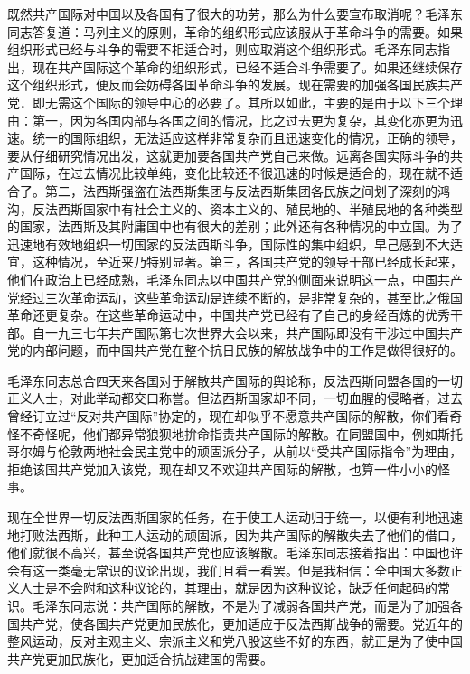 既然共产国际对中国以及各国有了很大的功劳，那么为什么要宣布取消呢？毛泽东同志答复道：马列主义的原则，革命的组织形式应该服从于革命斗争的需要。如果组织形式已经与斗争的需要不相适合时，则应取消这个组织形式。毛泽东同志指出，现在共产国际这个革命的组织形式，已经不适合斗争需要了。如果还继续保存这个组织形式，便反而会妨碍各国革命斗争的发展。现在需要的加强各国民族共产党．即无需这个国际的领导中心的必要了。其所以如此，主要的是由于以下三个理由：第一，因为各国内部与各国之间的情况，比之过去更为复杂，其变化亦更为迅速。统一的国际组织，无法适应这样非常复杂而且迅速变化的情况，正确的领导，要从仔细研究情况出发，这就更加要各国共产党自己来做。远离各国实际斗争的共产国际，在过去情况比较单纯，变化比较还不很迅速的时候是适合的，现在就不适合了。第二，法西斯强盗在法西斯集团与反法西斯集团各民族之间划了深刻的鸿沟，反法西斯国家中有社会主义的、资本主义的、殖民地的、半殖民地的各种类型的国家，法西斯及其附庸国中也有很大的差别；此外还有各种情况的中立国。为了迅速地有效地组织一切国家的反法西斯斗争，国际性的集中组织，早己感到不大适宜，这种情况，至近来乃特别显著。第三，各国共产党的领导干部已经成长起来，他们在政治上已经成熟，毛泽东同志以中国共产党的侧面来说明这一点，中国共产党经过三次革命运动，这些革命运动是连续不断的，是非常复杂的，甚至比之俄国革命还更复杂。在这些革命运动中，中国共产党已经有了自己的身经百炼的优秀干部。自一九三七年共产国际第七次世界大会以来，共产国际即没有干涉过中国共产党的内部问题，而中国共产党在整个抗日民族的解放战争中的工作是做得很好的。

毛泽东同志总合四天来各国对于解散共产国际的舆论称，反法西斯同盟各国的一切正义人士，对此举动都交口称誉。但法西斯国家却不同，一切血腥的侵略者，过去曾经订立过“反对共产国际”协定的，现在却似乎不愿意共产国际的解散，你们看奇怪不奇怪呢，他们都异常狼狈地拚命指责共产国际的解散。在同盟国中，例如斯托哥尔姆与伦敦两地社会民主党中的顽固派分子，从前以“受共产国际指令”为理由，拒绝该国共产党加入该党，现在却又不欢迎共产国际的解散，也算一件小小的怪事。

现在全世界一切反法西斯国家的任务，在于使工人运动归于统一，以便有利地迅速地打败法西斯，此种工人运动的顽固派，因为共产国际的解散失去了他们的借口，他们就很不高兴，甚至说各国共产党也应该解散。毛泽东同志接着指出：中国也许会有这一类毫无常识的议论出现，我们且看一看罢。但是我相信：全中国大多数正义人士是不会附和这种议论的，其理由，就是因为这种议论，缺乏任何起码的常识。毛泽东同志说：共产国际的解散，不是为了减弱各国共产党，而是为了加强各国共产党，使各国共产党更加民族化，更加适应于反法西斯战争的需要。党近年的整风运动，反对主观主义、宗派主义和党八股这些不好的东西，就正是为了使中国共产党更加民族化，更加适合抗战建国的需要。

